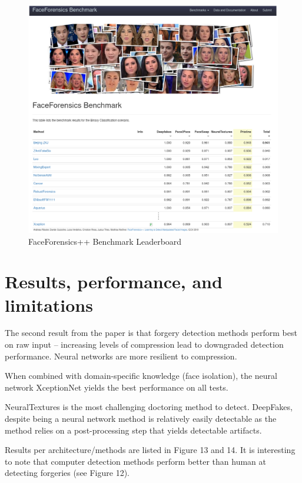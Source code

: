 \documentclass{article} %
\begin{document}
\begin{figure}[H]
\begin{center}
\includegraphics[width=\textwidth]{images/benchmark.png}
\end{center}
\caption{FaceForensics++ Benchmark Leaderboard}
\end{figure}
 
\section{Results, performance, and limitations}

The second result from the paper is that forgery detection methods perform best on raw input -- increasing levels of compression lead to downgraded detection performance. Neural networks are more resilient to compression.

When combined with domain-specific knowledge (face isolation), the neural network XceptionNet yields the best performance on all tests.

NeuralTextures is the most challenging doctoring method to detect. DeepFakes, despite being a neural network method is relatively easily detectable as the method relies on a post-processing step that yields detectable artifacts.

Results per architecture/methods are listed in Figure 13 and 14. It is interesting to note that computer detection methods perform better than human at detecting forgeries (see Figure 12).
\end{document}

